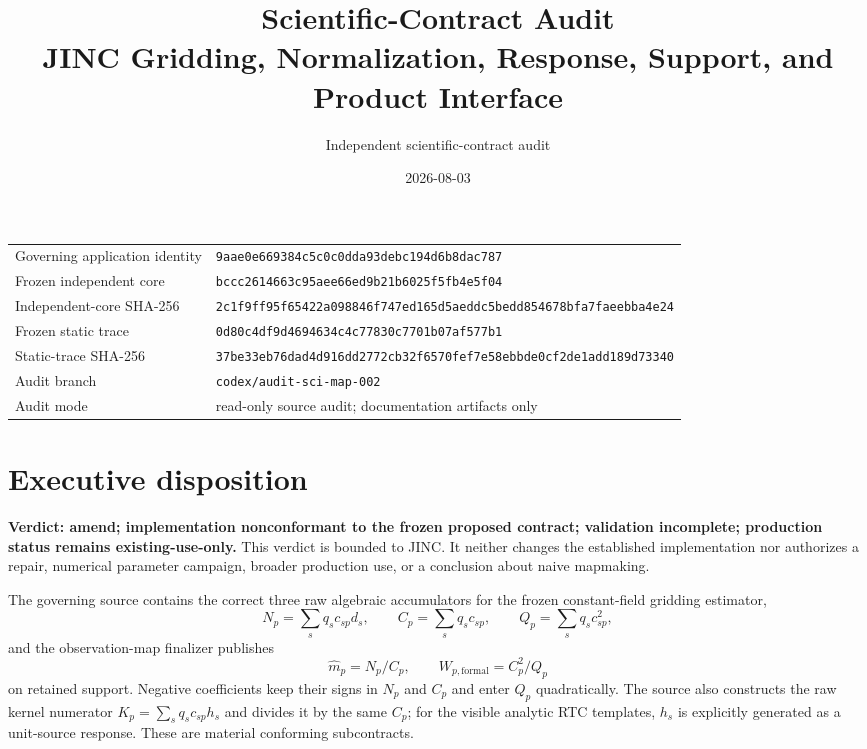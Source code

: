 \documentclass[10pt]{article}
\title{\packageid{} Scientific-Contract Audit\\
JINC Gridding, Normalization, Response, Support, and Product Interface}
\author{Independent scientific-contract audit}
\date{2026-08-03}
\newcommand{\appsha}{9aae0e669384c5c0c0dda93debc194d6b8dac787}
\newcommand{\corecommit}{bccc2614663c95aee66ed9b21b6025f5fb4e5f04}
\newcommand{\tracecommit}{0d80c4df9d4694634c4c77830c7701b07af577b1}
\begin{document}
\maketitle

\begin{center}
\begin{tabular}{@{}ll@{}}
\toprule
Governing application identity & \texttt{\appsha} \\
Frozen independent core & \texttt{\corecommit} \\
Independent-core SHA-256 & \texttt{2c1f9ff95f65422a098846f747ed165d5aeddc5bedd854678bfa7faeebba4e24} \\
Frozen static trace & \texttt{\tracecommit} \\
Static-trace SHA-256 & \texttt{37be33eb76dad4d916dd2772cb32f6570fef7e58ebbde0cf2de1add189d73340} \\
Audit branch & \texttt{codex/audit-sci-map-002} \\
Audit mode & read-only source audit; documentation artifacts only \\
\bottomrule
\end{tabular}
\end{center}

\section{Executive disposition}

\textbf{Verdict: amend; implementation nonconformant to the frozen proposed
contract; validation incomplete; production status remains existing-use-only.}
This verdict is bounded to JINC.  It neither changes the established
implementation nor authorizes a repair, numerical parameter campaign, broader
production use, or a conclusion about naive mapmaking.

The governing source contains the correct three raw algebraic accumulators for
the frozen constant-field gridding estimator,
\begin{equation}
  N_p=\sum_s q_s c_{sp}d_s,\qquad
  C_p=\sum_s q_s c_{sp},\qquad
  Q_p=\sum_s q_s c_{sp}^{2},
  \label{eq:raw}
\end{equation}
and the observation-map finalizer publishes
\begin{equation}
  \widehat m_p=N_p/C_p,\qquad
  W_{p,\mathrm{formal}}=C_p^2/Q_p
  \label{eq:final}
\end{equation}
on retained support.  Negative coefficients keep their signs in $N_p$ and
$C_p$ and enter $Q_p$ quadratically.  The source also constructs the raw
kernel numerator $K_p=\sum_s q_sc_{sp}h_s$ and divides it by the same $C_p$;
for the visible analytic RTC templates, $h_s$ is explicitly generated as a
unit-source response.  These are material conforming subcontracts.
\end{document}
